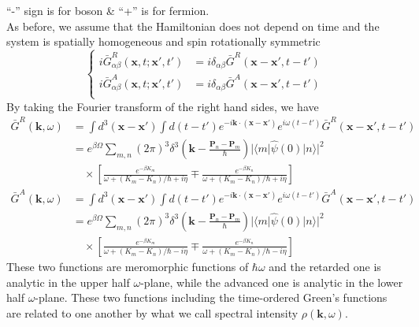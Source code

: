  ``-'' sign is for boson \& ``+'' is for fermion.\\
As before, we assume that the Hamiltonian does not depend on time and the system is spatially homogeneous and spin rotationally symmetric
\[
\left\{
\begin{aligned}
i\bar G ^R_{\alpha\beta}(\mathbf{x},t;\mathbf{x}',t')&=i\delta_{\alpha\beta} \bar G^R (\mathbf{x}-\mathbf{x}',t-t')\\
i\bar G ^A_{\alpha\beta}(\mathbf{x},t;\mathbf{x}',t')&=i\delta_{\alpha\beta} \bar G^A (\mathbf{x}-\mathbf{x}',t-t')\\
\end{aligned}
\right.
\]
By taking the Fourier transform of the right hand sides, we have
\begin{equation}
\begin{aligned}
\bar G^R(\mathbf{k},\omega)&=\int d^3(\mathbf{x}-\mathbf{x}') \int d(t-t') e^{-i\mathbf{k} \cdot (\mathbf{x}-\mathbf{x}')} e^{i\omega(t-t')} \bar G^R (\mathbf{x}-\mathbf{x}',t-t')\\
&=e^{\beta\Omega} \sum_{m,n} (2\pi)^3 \delta^3 (\mathbf{k}-\frac{\mathbf{P}_n-\mathbf{P}_m}{\hbar})  |\langle m|\hat{\psi}(0) |n\rangle |^2\\
&\quad \times \left[ \frac{e^{-\beta K_m}}{\omega+(K_m-K_n)/\hbar +i\eta} \mp \frac{e^{-\beta K_n}}{\omega+(K_m-K_n)/\hbar +i\eta} \right]
\end{aligned}
\end{equation}
\begin{equation}
\begin{aligned}
\bar G^A(\mathbf{k},\omega)&=\int d^3(\mathbf{x}-\mathbf{x}') \int d(t-t') e^{-i\mathbf{k} \cdot (\mathbf{x}-\mathbf{x}')} e^{i\omega(t-t')} \bar G^A (\mathbf{x}-\mathbf{x}',t-t')\\
&=e^{\beta\Omega} \sum_{m,n} (2\pi)^3 \delta^3 (\mathbf{k}-\frac{\mathbf{P}_n-\mathbf{P}_m}{\hbar})  |\langle m|\hat{\psi}(0) |n\rangle |^2\\
&\quad \times \left[ \frac{e^{-\beta K_m}}{\omega+(K_m-K_n)/\hbar -i\eta} \mp \frac{e^{-\beta K_n}}{\omega+(K_m-K_n)/\hbar -i\eta} \right]
\end{aligned}
\end{equation}
 These two functions are meromorphic functions of $\hbar\omega$ and the retarded one is analytic in the upper half $\omega$-plane, while the advanced one is analytic in the lower half $\omega$-plane.
 These two functions including the time-ordered Green's functions are related to one another by what we call spectral intensity $\rho(\mathbf{k},\omega)$.
